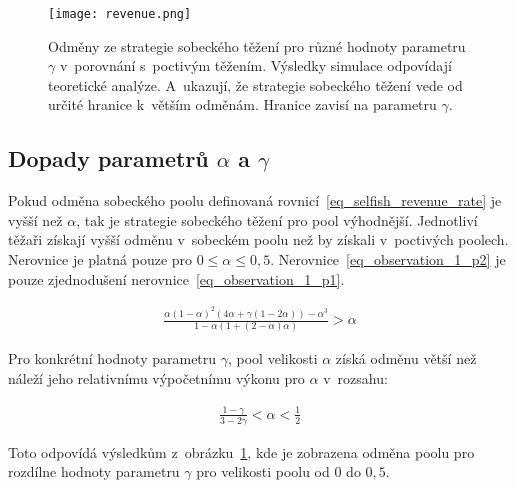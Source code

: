 \begin{figure}[H]
    \centering
    \texttt{[image: revenue.png]}
    \caption{Odměny ze strategie sobeckého těžení pro různé hodnoty parametru $\gamma$ v~porovnání s~poctivým těžením. Výsledky simulace odpovídají teoretické analýze. A~ukazují, že strategie sobeckého těžení vede od určité hranice k~větším odměnám. Hranice zavisí na parametru $\gamma$.}
    \label{fig_simulation}
\end{figure}


\subsection{Dopady parametrů $\alpha$ a $\gamma$}
\label{sec_analyza_efekt_parametru}

Pokud odměna sobeckého poolu definovaná rovnicí~\ref{eq_selfish_revenue_rate} je vyšší než $\alpha$, tak je strategie sobeckého těžení pro pool výhodnější. Jednotliví těžaři získají vyšší odměnu v~sobeckém poolu než by získali v~poctivých poolech. Nerovnice je platná pouze pro $0 \leq \alpha \leq 0,5$. Nerovnice~\ref{eq_observation_1_p2} je pouze zjednodušení nerovnice~\ref{eq_observation_1_p1}.

\begin{equation}
    \begin{aligned}
        \frac{\alpha (1 - \alpha)^2 (4 \alpha + \gamma (1 - 2 \alpha)) - \alpha^3}{1 - \alpha (1 + (2 - \alpha) \alpha)} > \alpha
    \end{aligned}
    \label{eq_observation_1_p1}
\end{equation}

\begin{theorem}
    Pro konkrétní hodnoty parametru $\gamma$, pool velikosti $\alpha$ získá odměnu větší než náleží jeho relativnímu výpočetnímu výkonu pro $\alpha$ v~rozsahu:

    \begin{equation}
        \begin{aligned}
            \frac{1 - \gamma}{3 - 2 \gamma} < \alpha < \frac{1}{2}
        \end{aligned}
        \label{eq_observation_1_p2}
    \end{equation}
\label{theorem_1}
\end{theorem}

Toto odpovídá výsledkům z~obrázku~\ref{fig_simulation}, kde je zobrazena odměna poolu pro rozdílne hodnoty parametru $\gamma$ pro velikosti poolu od $0$ do $0,5$.

